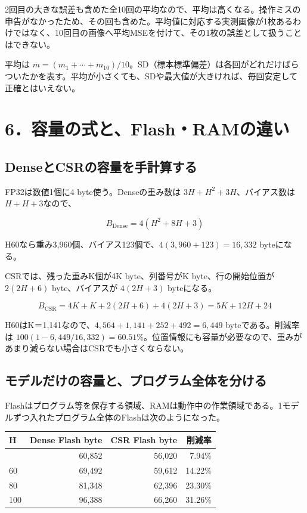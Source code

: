 \documentclass[
  11pt,
  a4paper,
]{article}
\begin{document}
2回目の大きな誤差も含めた全10回の平均なので、平均は高くなる。操作ミスの申告がなかったため、その回も含めた。平均値に対応する実測画像が1枚あるわけではなく、10回目の画像へ平均MSEを付けて、その1枚の誤差として扱うことはできない。

平均は
\(\overline m=(m_1+\cdots+m_{10})/10\)。SD（標本標準偏差）は各回がどれだけばらついたかを表す。平均が小さくても、SDや最大値が大きければ、毎回安定して正確とはいえない。

\newpage

\section{6．容量の式と、Flash・RAMの違い}\label{ux5bb9ux91cfux306eux5f0fux3068flashramux306eux9055ux3044}

\subsection{DenseとCSRの容量を手計算する}\label{denseux3068csrux306eux5bb9ux91cfux3092ux624bux8a08ux7b97ux3059ux308b}

FP32は数値1個に4 byte使う。Denseの重み数は \(3H+H^2+3H\)、バイアス数は
\(H+H+3\)なので、

\[B_{\mathrm{Dense}}=4(H^2+8H+3)\]

H60なら重み3,960個、バイアス123個で、\(4(3,960+123)=16,332\)
byteになる。

CSRでは、残った重みK個が4K byte、列番号がK byte、行の開始位置が
\(2(2H+6)\) byte、バイアスが \(4(2H+3)\) byteになる。

\[B_{\mathrm{CSR}}=4K+K+2(2H+6)+4(2H+3)=5K+12H+24\]

H60はK＝1,141なので、\(4,564+1,141+252+492=6,449\) byteである。削減率は
\(100(1-6,449/16,332)=60.51\%\)。位置情報にも容量が必要なので、重みがあまり減らない場合はCSRでも小さくならない。

\subsection{モデルだけの容量と、プログラム全体を分ける}\label{ux30e2ux30c7ux30ebux3060ux3051ux306eux5bb9ux91cfux3068ux30d7ux30edux30b0ux30e9ux30e0ux5168ux4f53ux3092ux5206ux3051ux308b}

Flashはプログラム等を保存する領域、RAMは動作中の作業領域である。1モデルずつ入れたプログラム全体のFlashは次のようになった。

\begin{longtable}[]{@{}lrrr@{}}
\toprule\noalign{}
H & Dense Flash byte & CSR Flash byte & 削減率 \\
\midrule\noalign{}
\endhead
\bottomrule\noalign{}
\endlastfoot
40 & 60,852 & 56,020 & 7.94\% \\
60 & 69,492 & 59,612 & 14.22\% \\
80 & 81,348 & 62,396 & 23.30\% \\
100 & 96,388 & 66,260 & 31.26\% \\
\end{longtable}
\end{document}
